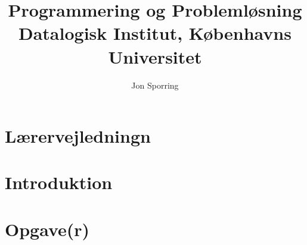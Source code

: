 \documentclass[a4paper,12pt]{article}
\title{Programmering og Problemløsning\\Datalogisk Institut,
  Københavns Universitet}
\author{Jon Sporring}
\begin{document}
\maketitle

\section{Lærervejledningn}

\section{Introduktion}

\section{Opgave(r)}

\end{document}
